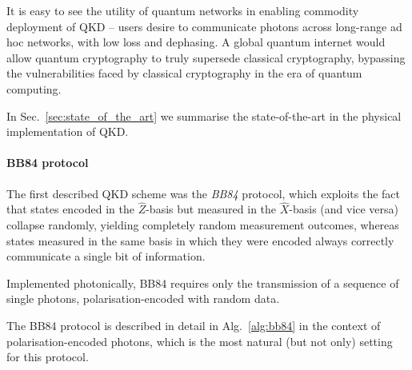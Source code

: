 It is easy to see the utility of quantum networks in enabling commodity deployment of QKD -- users desire to communicate photons across long-range ad hoc networks, with low loss and dephasing. A global quantum internet would allow quantum cryptography to truly supersede classical cryptography, bypassing the vulnerabilities faced by classical cryptography in the era of quantum computing.

In Sec.~\ref{sec:state_of_the_art} we summarise the state-of-the-art in the physical implementation of QKD.

%
%

\paragraph{BB84 protocol}

The first described QKD scheme was the \textit{BB84} \cite{bib:BennetBrassard84} protocol, which exploits the fact that states encoded in the $\hat{Z}$-basis but measured in the $\hat{X}$-basis (and vice versa) collapse randomly, yielding completely random measurement outcomes, whereas states measured in the same basis in which they were encoded always correctly communicate a single bit of information.

Implemented photonically, BB84 requires only the transmission of a sequence of single photons, polarisation-encoded with random data.

The BB84 protocol is described in detail in Alg.~\ref{alg:bb84} in the context of polarisation-encoded photons, which is the most natural (but not only) setting for this protocol.

